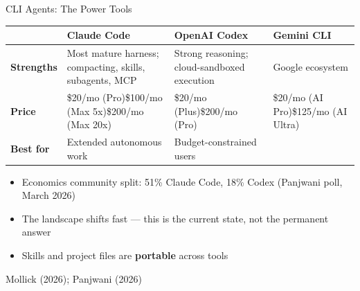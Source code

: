 \documentclass[aspectratio=169, 11pt]{beamer}
\newcommand{\emphgold}[1]{\alert{\textbf{#1}}}
\newcommand{\sourceref}[1]{\vspace{0.15cm}\hfill{\tiny\textcolor{medgray}{#1}}}
\begin{document}
\begin{frame}[shrink=5]{CLI Agents: The Power Tools}
\begin{center}
\footnotesize
\begin{tabular}{@{}p{2.5cm}p{3.5cm}p{3.5cm}p{3cm}@{}}
\toprule
& \textbf{Claude Code} & \textbf{OpenAI Codex} & \textbf{Gemini CLI} \\
\midrule
\textbf{Strengths} & Most mature harness; compacting, skills, subagents, MCP & Strong reasoning; cloud-sandboxed execution & Google ecosystem \\
\textbf{Price} & \$20/mo (Pro)\newline \$100/mo (Max 5x)\newline \$200/mo (Max 20x) & \$20/mo (Plus)\newline \$200/mo (Pro) & \$20/mo (AI Pro)\newline \$125/mo (AI Ultra) \\
\textbf{Best for} & Extended autonomous work & Budget-constrained users & \\
\bottomrule
\end{tabular}
\end{center}
\vspace{0.3cm}
\begin{itemize}
  \item Economics community split: 51\% Claude Code, 18\% Codex (Panjwani poll, March 2026)
  \item The landscape shifts fast --- this is the current state, not the permanent answer
  \item Skills and project files are \emphgold{portable} across tools
\end{itemize}
\sourceref{Mollick (2026); Panjwani (2026)}
\end{frame}
\end{document}
